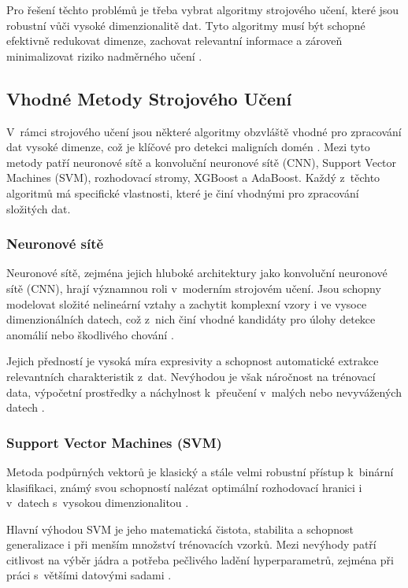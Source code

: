 Pro řešení těchto problémů je třeba vybrat algoritmy strojového učení, které jsou robustní vůči vysoké dimenzionalitě dat. Tyto algoritmy musí být schopné efektivně redukovat dimenze, zachovat relevantní informace a zároveň minimalizovat riziko nadměrného učení \cite{GuyonElisseeff2003}.

\subsection{Vhodné Metody Strojového Učení}

V~rámci strojového učení jsou některé algoritmy obzvláště vhodné pro zpracování dat vysoké dimenze, což je klíčové pro detekci maligních domén \cite{multi-dimension}. Mezi tyto metody patří neuronové sítě a konvoluční neuronové sítě (CNN), Support Vector Machines (SVM), rozhodovací stromy, XGBoost a AdaBoost. Každý z~těchto algoritmů má specifické vlastnosti, které je činí vhodnými pro zpracování složitých dat.

\subsubsection{Neuronové sítě}

Neuronové sítě, zejména jejich hluboké architektury jako konvoluční neuronové sítě (CNN), hrají významnou roli v~moderním strojovém učení. Jsou schopny modelovat složité nelineární vztahy a zachytit komplexní vzory i ve vysoce dimenzionálních datech, což z~nich činí vhodné kandidáty pro úlohy detekce anomálií nebo škodlivého chování \cite{LeCun2015}.

Jejich předností je vysoká míra expresivity a schopnost automatické extrakce relevantních charakteristik z~dat. Nevýhodou je však náročnost na trénovací data, výpočetní prostředky a náchylnost k~přeučení v~malých nebo nevyvážených datech \cite{goodfellow2016deep}.

\subsubsection{Support Vector Machines (SVM)}

Metoda podpůrných vektorů je klasický a stále velmi robustní přístup k~binární klasifikaci, známý svou schopností nalézat optimální rozhodovací hranici i v~datech s~vysokou dimenzionalitou \cite{cortes1995support}.

Hlavní výhodou SVM je jeho matematická čistota, stabilita a schopnost generalizace i při menším množství trénovacích vzorků. Mezi nevýhody patří citlivost na výběr jádra a potřeba pečlivého ladění hyperparametrů, zejména při práci s~většími datovými sadami \cite{yadav2010detecting}.

